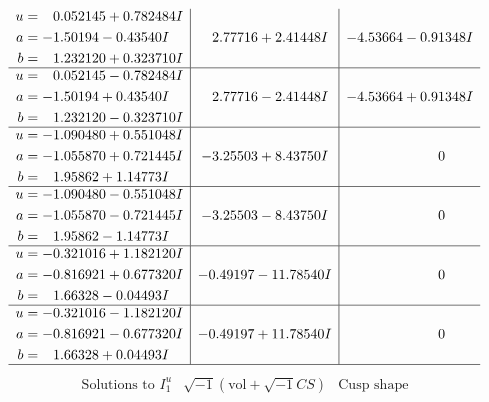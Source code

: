 \documentclass[1p]{elsarticle_modified}
\theoremstyle{definition}
\newcommand{\I}{\sqrt{-1}}
\begin{document}
$$\begin{array}{c|c|c}
\begin{aligned}
u &= \phantom{-}0.052145 + 0.782484 I \\
a &= -1.50194 - 0.43540 I \\
b &= \phantom{-}1.232120 + 0.323710 I\end{aligned}
 & \phantom{-}2.77716 + 2.41448 I & -4.53664 - 0.91348 I \\ \hline\begin{aligned}
u &= \phantom{-}0.052145 - 0.782484 I \\
a &= -1.50194 + 0.43540 I \\
b &= \phantom{-}1.232120 - 0.323710 I\end{aligned}
 & \phantom{-}2.77716 - 2.41448 I & -4.53664 + 0.91348 I \\ \hline\begin{aligned}
u &= -1.090480 + 0.551048 I \\
a &= -1.055870 + 0.721445 I \\
b &= \phantom{-}1.95862 + 1.14773 I\end{aligned}
 & -3.25503 + 8.43750 I & \phantom{-0.000000 } 0 \\ \hline\begin{aligned}
u &= -1.090480 - 0.551048 I \\
a &= -1.055870 - 0.721445 I \\
b &= \phantom{-}1.95862 - 1.14773 I\end{aligned}
 & -3.25503 - 8.43750 I & \phantom{-0.000000 } 0 \\ \hline\begin{aligned}
u &= -0.321016 + 1.182120 I \\
a &= -0.816921 + 0.677320 I \\
b &= \phantom{-}1.66328 - 0.04493 I\end{aligned}
 & -0.49197 - 11.78540 I & \phantom{-0.000000 } 0 \\ \hline\begin{aligned}
u &= -0.321016 - 1.182120 I \\
a &= -0.816921 - 0.677320 I \\
b &= \phantom{-}1.66328 + 0.04493 I\end{aligned}
 & -0.49197 + 11.78540 I & \phantom{-0.000000 } 0\\
 \hline 
 \end{array}$$\newpage$$\begin{array}{c|c|c}  
\text{Solutions to }I^u_{1}& \I (\text{vol} + \sqrt{-1}CS) & \text{Cusp shape}\\
 \hline 
\begin{aligned}

\end{aligned}
\end{array}$$
\end{document}

